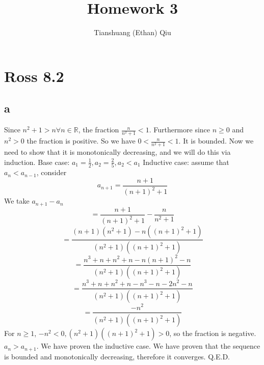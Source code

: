\documentclass[12pt]{article}
\author{Tianshuang (Ethan) Qiu}
\newcommand{\R}{\mathbb{R}}
\begin{document}
\title{Homework 3}
\maketitle
\newpage

\section{Ross 8.2}

\subsection{a}
Since $n^2+1 > n \forall n \in \R$, the fraction  $\frac{n}{n^2+1} < 1$. Furthermore since $n \geq 0$ and $n^2 > 0$ the fraction is positive. So we have $0 < \frac{n}{n^2+1} < 1$. It is bounded.
\newline
Now we need to show that it is monotonically decreasing, and we will do this via induction.
\newline
Base case: $a_1 = \frac{1}{2}, a_2 = \frac{2}{5}, a_2 < a_1$
\newline
Inductive case: assume that $a_n < a_{n-1}$, consider $$a_{n+1} = \frac{n+1}{(n+1)^2+1}$$
We take $a_{n+1} - a_n$
$$ = \frac{n+1}{(n+1)^2+1} - \frac{n}{n^2+1}$$
$$ = \frac{(n+1)(n^2+1)-n((n+1)^2+1)}{(n^2+1)((n+1)^2+1)}$$
$$ = \frac{n^3+n+n^2+n-n(n+1)^2-n}{(n^2+1)((n+1)^2+1)}$$
$$ = \frac{n^3+n+n^2+n-n^3-n-2n^2-n}{(n^2+1)((n+1)^2+1)}$$
$$ = \frac{-n^2}{(n^2+1)((n+1)^2+1)}$$
For $n \geq 1$, $-n^2 < 0, (n^2+1)((n+1)^2+1) > 0$, so the fraction is negative. $a_n > a_{n+1}$. We have proven the inductive case.
\newline
We have proven that the sequence is bounded and monotonically decreasing, therefore it converges. Q.E.D.
\end{document}
